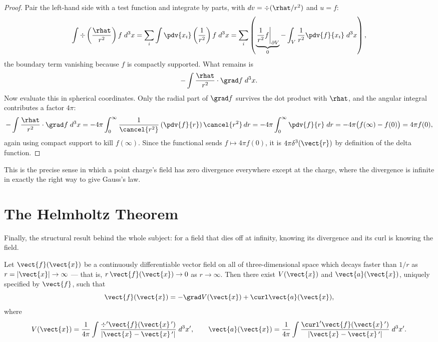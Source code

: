 \begin{proof}
Pair the left-hand side with a test function and integrate by parts, with $dv = \div(\rhat/r^2)$ and $u = f$:
\[
    \int \div\left(\frac{\rhat}{r^2}\right) f\; d^3x
    = \sum_i \int \pdv{x_i}\left(\frac{1}{r^2}\right) f\; d^3x
    = \sum_i \left(\underbrace{\left.\frac{1}{r^2}f\right|_{\partial V}}_{0} - \int_V \frac{1}{r^2}\pdv{f}{x_i}\; d^3x\right),
\]
the boundary term vanishing because $f$ is compactly supported. What remains is
\[
    -\int \frac{\rhat}{r^2}\cdot\grad f\; d^3x.
\]
Now evaluate this in spherical coordinates. Only the radial part of $\grad f$ survives the dot product with $\rhat$, and the angular integral contributes a factor $4\pi$:
\[
    -\int \frac{\rhat}{r^2}\cdot\grad f\; d^3x = -4\pi\int_0^\infty \frac{1}{\cancel{r^2}}\left(\pdv{f}{r}\right)\cancel{r^2}\,dr
    = -4\pi\int_0^\infty \pdv{f}{r}\; dr = -4\pi\bigl(f(\infty) - f(0)\bigr) = 4\pi f(0),
\]
again using compact support to kill $f(\infty)$. Since the functional sends $f \mapsto 4\pi f(0)$, it is $4\pi\delta^3(\vect{r})$ by definition of the delta function.
\end{proof}

This is the precise sense in which a point charge's field has zero divergence everywhere except at the charge, where the divergence is infinite in exactly the right way to give Gauss's law.

\section{The Helmholtz Theorem}

Finally, the structural result behind the whole subject: for a field that dies off at infinity, knowing its divergence and its curl is knowing the field.

\begin{theorem}[Helmholtz]
Let $\vect{f}(\vect{x})$ be a continuously differentiable vector field on all of three-dimensional space which decays faster than $1/r$ as $r = |\vect{x}|\to\infty$ --- that is, $r\,\vect{f}(\vect{x})\to 0$ as $r\to\infty$. Then there exist $V(\vect{x})$ and $\vect{a}(\vect{x})$, uniquely specified by $\vect{f}$, such that
\[
    \vect{f}(\vect{x}) = -\grad V(\vect{x}) + \curl\vect{a}(\vect{x}),
\]
where
\[
    V(\vect{x}) = \frac{1}{4\pi}\int \frac{\div'\vect{f}(\vect{x}\,')}{|\vect{x}-\vect{x}\,'|}\; d^3x',
    \qquad
    \vect{a}(\vect{x}) = \frac{1}{4\pi}\int \frac{\curl'\vect{f}(\vect{x}\,')}{|\vect{x}-\vect{x}\,'|}\; d^3x'.
\]
\end{theorem}

